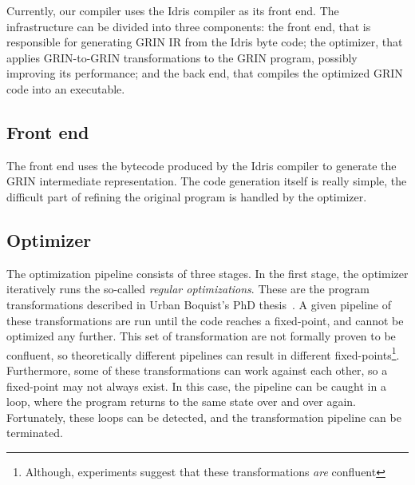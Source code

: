 \documentclass[main.tex]{subfiles}
\begin{document}
	
	Currently, our compiler uses the Idris compiler as its front end. The infrastructure can be divided into three components: the front end, that is responsible for generating GRIN IR from the Idris byte code; the optimizer, that applies GRIN-to-GRIN transformations to the GRIN program, possibly improving its performance; and the back end, that compiles the optimized GRIN code into an executable.
	
	\subsection{Front end}
	
	The front end uses the bytecode produced by the Idris compiler to generate the GRIN intermediate representation. The code generation itself is really simple, the difficult part of refining the original program is handled by the optimizer. 
	
	\subsection{Optimizer}
	\label{subsec:optimizer}
	
	The optimization pipeline consists of three stages. In the first stage, the optimizer iteratively runs the so-called \textit{regular optimizations}. These are the program transformations described in Urban Boquist's PhD thesis~\cite{boquist-phd}. A given pipeline of these transformations are run until the code reaches a fixed-point, and cannot be optimized any further. This set of transformation are not formally proven to be confluent, so theoretically different pipelines can result in different fixed-points\footnote{Although, experiments suggest that these transformations \textit{are} confluent}. Furthermore, some of these transformations can work against each other, so a fixed-point may not always exist. In this case, the pipeline can be caught in a loop, where the program returns to the same state over and over again. Fortunately, these loops can be detected, and the transformation pipeline can be terminated. 
	
\end{document}
